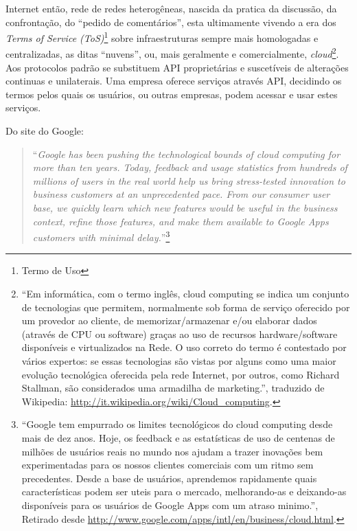 Internet então, rede de redes heterogêneas, nascida da pratica da
discussão, da confrontação, do ``pedido de comentários'', esta
ultimamente vivendo a era dos \emph{Terms of Service
  (ToS)}\footnote{Termo de Uso} sobre infraestruturas sempre mais
homologadas e centralizadas, as ditas ``nuvens'', ou, mais geralmente
e comercialmente, \emph{cloud}\footnote{``Em informática, com o termo
  inglês, cloud computing se indica um conjunto de tecnologias que
  permitem, normalmente sob forma de serviço oferecido por um provedor
ao cliente, de memorizar/armazenar e/ou elaborar dados (através de CPU
ou software) graças ao uso de recursos hardware/software disponíveis e
virtualizados na Rede. O uso correto do termo é contestado por vários
expertos: se essas tecnologias são vistas por alguns como uma maior
evolução tecnológica oferecida pela rede Internet, por outros, como
Richard Stallman, são considerados uma armadilha de marketing.'',
traduzido de Wikipedia:
\url{http://it.wikipedia.org/wiki/Cloud_computing}.}. Aos protocolos
padrão se substituem API proprietárias e suscetíveis de alterações
continuas e unilaterais. Uma empresa oferece serviços através API,
decidindo os termos pelos quais os usuários, ou outras empresas, podem
acessar e usar estes serviços.  

Do site do Google:
\begin{quote}
  ``\emph{Google has been pushing the technological bounds of cloud
    computing for more than ten years. Today, feedback and usage
    statistics from hundreds of millions of users in the real world
    help us bring stress-tested innovation to business customers at an
    unprecedented pace. From our consumer user base, we quickly learn
    which new features would be useful in the business context, refine
    those features, and make them available to Google Apps customers
    with minimal delay.}''\footnote{``Google tem empurrado os limites
    tecnológicos do cloud computing desde mais de dez anos. Hoje, os
    feedback e as estatísticas de uso de centenas de milhões de
    usuários reais no mundo nos ajudam a trazer inovações bem
    experimentadas para os nossos clientes comerciais com um ritmo sem
    precedentes.  Desde a base de usuários, aprendemos rapidamente
    quais características podem ser uteis para o mercado,
    melhorando-as e deixando-as disponíveis para os usuários de Google
    Apps com um atraso minimo.'', Retirado desde
    \url{http://www.google.com/apps/intl/en/business/cloud.html}.}
\end{quote}

